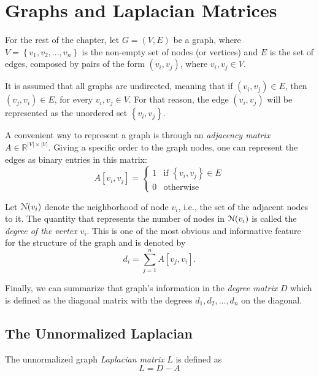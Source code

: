 \section{Graphs and Laplacian Matrices}
For the rest of the chapter, let $G=(V,E)$ be a graph, where $V=\left\{v_1, v_2, ... , v_n\right\}$ is the non-empty set of nodes (or vertices) and $E$ is the set of edges, composed by pairs of the form $(v_i, v_j)$, where $v_i, v_j \in V$.

It is assumed that all graphs are undirected, meaning that if $(v_i, v_j)\in E$, then $(v_j, v_i)\in E$, for every $v_i,v_j \in V$. For that reason, the edge $(v_i, v_j)$ will be represented as the unordered set $\left\{ v_i, v_j\right\}$.

    A convenient way to represent a graph is through an \textit{adjacency matrix} $A\in\mathbb{R}^{\left|V\right|\times\left|V\right|}$. Giving a specific order to the graph nodes, one can represent the edges as binary entries in this matrix:
    \begin{displaymath}
        A[v_i, v_j] = 
        \begin{cases}
            1 & \text{if } \left\{ v_i, v_j\right\}\in E \\
            0 & \text{otherwise}
        \end{cases}
    \end{displaymath}
    
    Let $\EuScript{N}(v_i)$ denote the neighborhood of node $v_i$, i.e., the set of the adjacent nodes to it. The quantity that represents the number of nodes in $\EuScript{N}(v_i)$ is called the \textit{degree of the vertex} $v_i$. This is one of the most obvious and informative feature for the structure of the graph and is denoted by
	\begin{displaymath}
		d_i = \sum_{j=1}^n A[v_j, v_i].
	\end{displaymath}
	
	Finally, we can summarize that graph's information in the \textit{degree matrix} $D$ which is defined as the diagonal matrix with the degrees $d_1, d_2, ..., d_n$ on the diagonal.
	
\subsection{The Unnormalized Laplacian}
	The unnormalized graph \textit{Laplacian matrix} $L$ is defined as 
	\begin{displaymath}
		L = D - A
	\end{displaymath}
	
